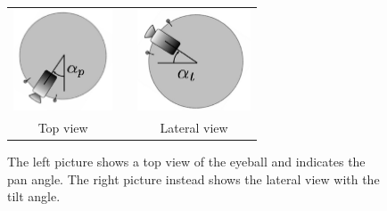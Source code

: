 \begin{figure}
  \begin{center}
  \begin{tabular}{ccc}
  \parbox{40mm}{\includegraphics[height=30mm]{Figure/EyePan.eps}}  & &
  \parbox{40mm}{\includegraphics[height=30mm]{Figure/EyeTilt.eps}}\\
  Top view & & Lateral view
  \end{tabular}
  \end{center}
  \caption{The left picture shows a top view of the eyeball and indicates the pan angle. The right picture instead shows the lateral view with the tilt angle.}\label{Fig:EyePanTilt}
 \end{figure}

